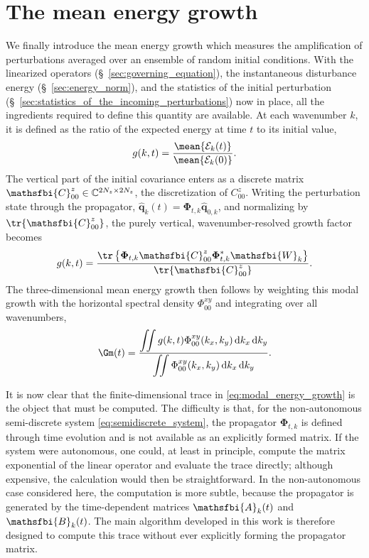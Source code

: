 \section{The mean energy growth}
\label{sec:mean_energy_growth}
We finally introduce the mean energy growth which measures the amplification of perturbations averaged over an ensemble of random initial conditions. With the linearized operators (\S~\ref{sec:governing_equation}), the instantaneous disturbance energy (\S~\ref{sec:energy_norm}), and the statistics of the initial perturbation (\S~\ref{sec:statistics_of_the_incoming_perturbations}) now in place, all the ingredients required to define this quantity are available. At each wavenumber $k$, it is defined as the ratio of the expected energy at time $t$ to its initial value,
\begin{equation}
    \label{eq:mean_energy_growth_def}
    g(k,t)
    =
    \frac{\mean{\mathcal{E}_k(t)}}{\mean{\mathcal{E}_k(0)}}.
\end{equation}
The vertical part of the initial covariance enters as a discrete matrix \(\mathsfbi{C}_{00}^{z}\in\mathbb{C}^{2N_z\times 2N_z}\), the discretization of \(C_{00}^{z}\). Writing the perturbation state through the propagator, \(\hat{\mathbf{q}}_k(t)=\boldsymbol{\Phi}_{t,k}\hat{\mathbf{q}}_{0,k}\), and normalizing by \(\tr\{\mathsfbi{C}_{00}^{z}\}\), the purely vertical, wavenumber-resolved growth factor becomes
\begin{equation}
    g(k,t)
    =
    \frac{
      \tr
      \left\{
        \boldsymbol{\Phi}_{t,k}
        \mathsfbi{C}_{00}^{z}
        \boldsymbol{\Phi}_{t,k}^{*}
        \mathsfbi{W}_{k}
      \right\}
    }{
      \tr\{\mathsfbi{C}_{00}^{z}\}
    }.
    \label{eq:modal_energy_growth}
\end{equation}
The three-dimensional mean energy growth then follows by weighting this modal growth with the horizontal spectral density \(\Phi_{00}^{xy}\) and integrating over all wavenumbers,
\begin{equation}
    \Gm(t)
    =
    \frac{
      \displaystyle
      \iint
      g(k,t)
      \Phi_{00}^{xy}(k_x,k_y)
      \,\mathrm{d}k_x\,\mathrm{d}k_y
    }{
      \displaystyle
      \iint
      \Phi_{00}^{xy}(k_x,k_y)
      \,\mathrm{d}k_x\,\mathrm{d}k_y
    }.
    \label{eq:gmean_continuous_fourier}
\end{equation}

It is now clear that the finite-dimensional trace in \eqref{eq:modal_energy_growth} is the object that must be computed. The difficulty is that, for the non-autonomous semi-discrete system \eqref{eq:semidiscrete_system}, the propagator \(\boldsymbol{\Phi}_{t,k}\) is defined through time evolution and is not available as an explicitly formed matrix. If the system were autonomous, one could, at least in principle, compute the matrix exponential of the linear operator and evaluate the trace directly; although expensive, the calculation would then be straightforward. In the non-autonomous case considered here, the computation is more subtle, because the propagator is generated by the time-dependent matrices \(\mathsfbi{A}_{k}(t)\) and \(\mathsfbi{B}_{k}(t)\). The main algorithm developed in this work is therefore designed to compute this trace without ever explicitly forming the propagator matrix.


